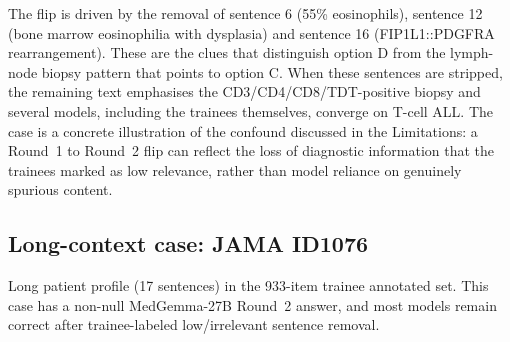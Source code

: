 \documentclass[11pt]{article}
\begin{document}
\noindent The flip is driven by the removal of sentence 6 (55\% eosinophils), sentence 12 (bone marrow eosinophilia with dysplasia) and sentence 16 (FIP1L1::PDGFRA rearrangement). These are the clues that distinguish option D from the lymph-node biopsy pattern that points to option C. When these sentences are stripped, the remaining text emphasises the CD3/CD4/CD8/TDT-positive biopsy and several models, including the trainees themselves, converge on T-cell ALL. The case is a concrete illustration of the confound discussed in the Limitations: a Round~1 to Round~2 flip can reflect the loss of diagnostic information that the trainees marked as low relevance, rather than model reliance on genuinely spurious content.


\subsection{Long-context case: JAMA ID1076}
\label{sample:jama_id1076}

Long patient profile (17 sentences) in the 933-item trainee annotated set. This case has a non-null MedGemma-27B Round~2 answer, and most models remain correct after trainee-labeled low/irrelevant sentence removal.
\end{document}
